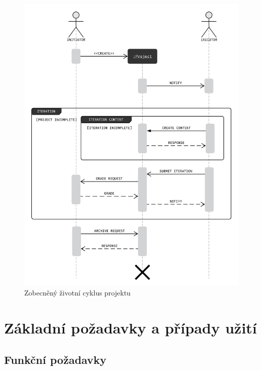 \begin{figure}[htbp]
   \centering
   \includegraphics[max width=\textwidth]{assets/dia-seq-study-project-lifecycle}
   \caption[Zobecněný životní cyklus projektu]{Zobecněný životní cyklus projektu~\cite{bachelorthesis}}\label{fig:main-communication-cycle}
\end{figure}

\clearpage



\section{Základní požadavky a případy užití}\label{sec:required-spec}



\subsection{Funkční požadavky}\label{subsec:spec-req-func}

